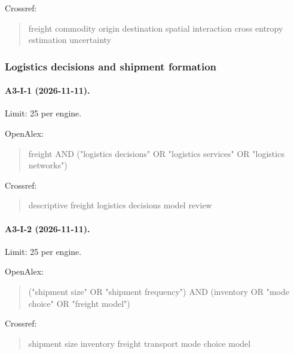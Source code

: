 \noindent Crossref:

\begin{quote}\footnotesize\ttfamily\raggedright

freight commodity origin destination spatial interaction cross entropy estimation uncertainty

\end{quote}

\subsubsection{Logistics decisions and shipment formation}

\paragraph{A3-I-1 (2026-11-11).} Limit: 25 per engine.

\noindent OpenAlex:

\begin{quote}\footnotesize\ttfamily\raggedright

freight AND ("logistics decisions" OR "logistics services" OR "logistics networks")

\end{quote}

\noindent Crossref:

\begin{quote}\footnotesize\ttfamily\raggedright

descriptive freight logistics decisions model review

\end{quote}

\paragraph{A3-I-2 (2026-11-11).} Limit: 25 per engine.

\noindent OpenAlex:

\begin{quote}\footnotesize\ttfamily\raggedright

("shipment size" OR "shipment frequency") AND (inventory OR "mode choice" OR "freight model")

\end{quote}

\noindent Crossref:

\begin{quote}\footnotesize\ttfamily\raggedright

shipment size inventory freight transport mode choice model

\end{quote}

